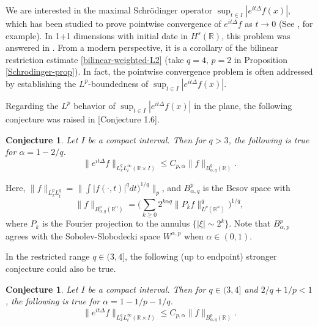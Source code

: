 \documentclass{amsart}
\numberwithin{equation}{section}
\newtheorem{conjecture}[theorem]{Conjecture}
\newcommand{\al}{\alpha}
\newcommand{\De}{\Delta}
\newcommand{\ZR}{\mathbb{R}}
\begin{document}
We are interested in the maximal Schr\"odinger operator $\sup_{t\in I}|e^{it\De}f(x)|$, which has been studied to prove pointwise convergence of $e^{it\De}f$ as $t\to0$ (See \cite{Dahlberg-Kenig,Du-Li-Guth-Schrodinger-R3,Du-Zhang}, for example).
In 1+1 dimensions with initial date in $H^s(\ZR)$, this problem was answered in \cite{Dahlberg-Kenig}.
From a modern perspective, it is a corollary of the bilinear restriction estimate \eqref{bilinear-weighted-L2} (take $q=4,\, p=2$ in  Proposition \ref{Schrodinger-prop}).
In fact, the pointwise convergence problem is often addressed by establishing the $L^p$-boundedness of $\sup_{t\in I}|e^{it\De}f(x)|$.


\smallskip

Regarding the $L^p$ behavior of $\sup_{t\in I}|e^{it\De}f(x)|$ in the plane, the following conjecture was raised in \cite{Lee-Rogers-Seeger}[Conjecture 1.6].
\begin{conjecture}
\label{maximal-schrodinger-conj}
Let $I$ be a compact interval.
Then for $q>3$, the following is true for $\al=1-2/q$.
\begin{equation}
    \|e^{it\De}f\|_{L^q_xL^\infty_t(\ZR\times I)}\leq C_{p,\al}\|f\|_{B^q_{\al,q}(\ZR)}.
\end{equation}
\end{conjecture}
Here, $\|f\|_{L^p_{x}L^q_t}=\|\int|f(\cdot,t)|^qdt)^{1/q}\|_p$, and $B^p_{\al,q}$ is the Besov space with
\begin{equation}
    \|f\|_{B^p_{\al,q}(\ZR^n)}=\big(\sum_{k\geq0}2^{k\al q}\|P_k f\|_{L^p(\ZR^n)}^q\big)^{1/q},
\end{equation}
where $P_k$ is the Fourier projection to the annulus $\{|\xi|\sim 2^k\}$.
Note that $B^p_{\al,p}$ agrees with the Sobolev-Slobodecki space $W^{\al,p}$ when $\al\in(0,1)$.

\smallskip 




In the restricted range $q\in(3,4]$, the following (up to endpoint) stronger conjecture could also be true.
\begin{conjecture}
\label{finer-conjecture}
Let $I$ be a compact interval.
Then for $q\in(3,4]$ and $2/q+1/p<1$, the following is true for $\al=1-1/p-1/q$.
\begin{equation}
    \|e^{it\De}f\|_{L^q_xL^\infty_t(\ZR\times I)}\leq C_{p,\al}\|f\|_{B^p_{\al,q}(\ZR)}.
\end{equation}
\end{conjecture}

\smallskip
\end{document}
